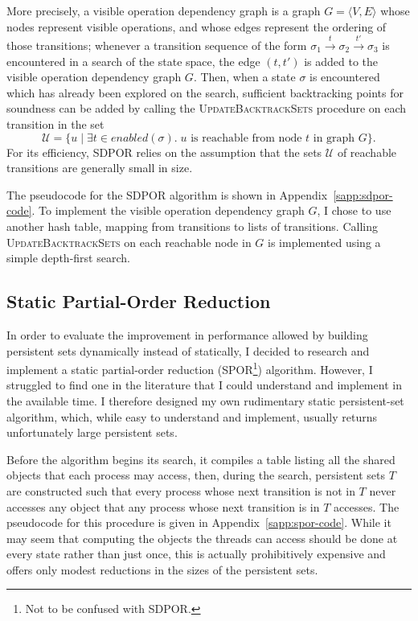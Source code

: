 \documentclass[12pt,a4paper,twoside,openany]{report}
\begin{document}
More precisely, a visible operation dependency
graph is a graph $G = \langle V, E \rangle$ whose
nodes represent visible operations, and whose edges
represent the ordering of those transitions; whenever
a transition sequence of the form
$\sigma_1 \xrightarrow{t} \sigma_2 \xrightarrow{t'}
 \sigma_3$
is encountered in a search of the state space, the
edge $(t, t')$ is added to the visible operation
dependency graph $G$. Then, when a state $\sigma$ is
encountered which has already been explored on the
search, sufficient backtracking points for soundness
can be added by calling the
\textsc{UpdateBacktrackSets} procedure
on each transition in the set
\[\mathcal{U} = \{u \mid \exists t \in \textit{enabled}(\sigma).\;
   u \text{ is reachable from node } t \text{ in graph } G\}.\]
For its efficiency, SDPOR relies on the assumption that
the sets $\mathcal{U}$ of reachable transitions
are generally small in size.

The pseudocode for the SDPOR algorithm is shown
in Appendix~\ref{sapp:sdpor-code}.
To implement the visible operation dependency graph
$G$, I chose to use another hash table,
mapping from transitions to lists of transitions.
Calling \textsc{UpdateBacktrackSets} on
each reachable node in $G$ is implemented using
a simple depth-first search.

\subsection{Static Partial-Order Reduction}
\label{sec:spor-imp}

In order to evaluate the improvement in performance
allowed by building persistent sets dynamically
instead of statically, I decided to research and
implement a static partial-order reduction
(SPOR\footnote{Not to be confused with SDPOR.})
algorithm. However, I struggled to find one
in the literature that I could
understand and implement in the available time.
I therefore designed my own
rudimentary static persistent-set algorithm, which,
while easy to understand and implement,
usually returns unfortunately large persistent sets.

Before the algorithm begins its search, it compiles a table
listing all the shared objects that each process may
access, then, during the search, persistent sets $T$ are
constructed such that
every process whose next transition is
not in $T$ never accesses any
object that any process whose next
transition is in $T$ accesses.
The pseudocode for this procedure is
given in Appendix~\ref{sapp:spor-code}.
While it may seem that computing
the objects the threads can access
should be done at every state rather than
just once, this is actually prohibitively
expensive and offers only modest
reductions in the sizes of the
persistent sets.
\end{document}
